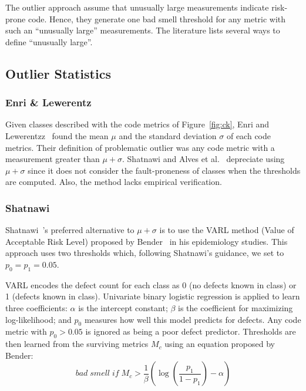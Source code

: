 \documentclass[twocolumn,5p]{elsarticle}
\newcommand{\fig}[1]{Figure~\ref{fig:#1}}
\theoremstyle{break}
\begin{document}
The outlier approach assume that unusually large measurements indicate risk-prone code.
Hence, they generate one bad smell threshold for any metric
with such an ``unusually large'' measurements. 
The literature lists several ways to define ``unusually large''.

\subsection{Outlier Statistics}

\subsubsection{Enri \& Lewerentz}
Given classes described with the  code metrics of \fig{ck},
Enri and Lewerentzz~\cite{erni96} found the   mean $\mu$ and the standard deviation $\sigma$
of each
code metrics. Their definition of problematic outlier was any code
metric with a measurement greater than $\mu+\sigma$.
Shatnawi and Alves et al.~\cite{Shatnawi10,Alves2010} depreciate
using $\mu+\sigma$ since it does not consider the fault-proneness of classes when the thresholds are computed. Also, the method lacks  empirical verification.

\subsubsection{ Shatnawi}
Shatnawi~\cite{Shatnawi10}'s preferred alternative to $\mu+\sigma$
is to use the VARL method (Value of Acceptable Risk Level) proposed by Bender~\cite{bender99} in his epidemiology studies.  This approach uses two
thresholds which, following Shatnawi's guidance, we set to
$p_0=p_1=0.05$. 

VARL encodes the defect count
for each class as 0 (no defects known in class) or 1 (defects known in class).
Univariate binary logistic regression is applied to learn three coefficients:  
 $\alpha$ is the intercept constant;
    $\beta$ is the coefficient for maximizing log-likelihood;
  and $p_0$  
    measures   how well this   model predicts for   defects.
Any code metric with $p_0>0.05$ is  ignored as being a poor defect predictor. Thresholds are then learned from the surviving metrics $M_c$ using
an equation proposed by Bender:
\begin{equation}
 \mathit{bad\; smell\; if\;} M_c > \frac{1}{\beta }\left( {\log \left( {\frac{{{p_1}}}{{1 - {p_1}}}} \right) - \alpha } \right) 
\end{equation}
\end{document}
